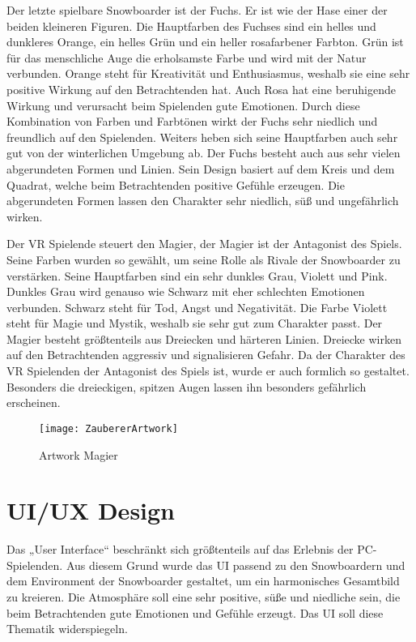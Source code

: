 Der letzte spielbare Snowboarder ist der Fuchs. Er ist wie der Hase einer der beiden kleineren Figuren. Die Hauptfarben des Fuchses sind ein helles und dunkleres Orange, ein helles Grün und ein heller rosafarbener Farbton. Grün ist für das menschliche Auge die erholsamste Farbe und wird mit der Natur verbunden. Orange steht für Kreativität und Enthusiasmus, weshalb sie eine sehr positive Wirkung auf den Betrachtenden hat. Auch Rosa hat eine beruhigende Wirkung und verursacht beim Spielenden gute Emotionen. Durch diese Kombination von Farben und Farbtönen wirkt der Fuchs sehr niedlich und freundlich auf den Spielenden. Weiters heben sich seine Hauptfarben auch sehr gut von der winterlichen Umgebung ab.
Der Fuchs besteht auch aus sehr vielen abgerundeten Formen und Linien. Sein Design basiert auf dem Kreis und dem Quadrat, welche beim Betrachtenden positive Gefühle erzeugen. Die abgerundeten Formen lassen den Charakter sehr niedlich, süß und ungefährlich wirken. 



Der VR Spielende steuert den Magier, der Magier ist der Antagonist des Spiels. Seine Farben wurden so gewählt, um seine Rolle als Rivale der Snowboarder zu verstärken. Seine Hauptfarben sind ein sehr dunkles Grau, Violett und Pink. Dunkles Grau wird genauso wie Schwarz mit eher schlechten Emotionen verbunden. Schwarz steht für Tod, Angst und Negativität. Die Farbe Violett steht für Magie und Mystik, weshalb sie sehr gut zum Charakter passt.
Der Magier besteht größtenteils aus Dreiecken und härteren Linien. Dreiecke wirken auf den Betrachtenden aggressiv und signalisieren Gefahr. Da der Charakter des VR Spielenden der Antagonist des Spiels ist, wurde er auch formlich so gestaltet. Besonders die dreieckigen, spitzen Augen lassen ihn besonders gefährlich erscheinen.

\begin{figure}[H]
	\centering
	\texttt{[image: ZaubererArtwork]}
	\caption{Artwork Magier}
\end{figure}


\section{UI/UX Design}
Das „User Interface“ beschränkt sich größtenteils auf das Erlebnis der PC-Spielenden. Aus diesem Grund wurde das UI passend zu den Snowboardern und dem Environment der Snowboarder gestaltet, um ein harmonisches Gesamtbild zu kreieren. Die Atmosphäre soll eine sehr positive, süße und niedliche sein, die beim Betrachtenden gute Emotionen und Gefühle erzeugt. Das UI soll diese Thematik widerspiegeln.

